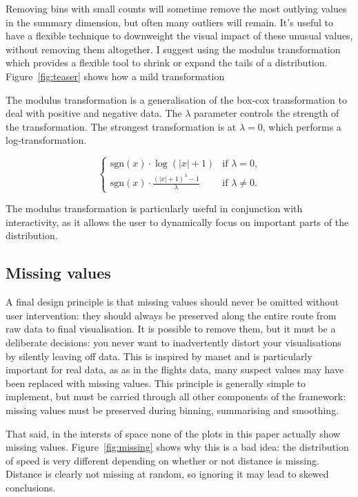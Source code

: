 \documentclass[journal]{vgtc}                %
\begin{document}
Removing bins with small counts will sometime remove the most outlying values in the summary dimension, but often many outliers will remain. It's useful to have a flexible technique to downweight the visual impact of these unusual values, without removing them altogether.  I suggest using the modulus transformation which provides a flexible tool to shrink or expand the tails of a distribution. Figure~\ref{fig:teaser} shows how a mild transformation 

The modulus transformation \citep{john:1980} is a generalisation of the box-cox transformation \citep{box:1964} to deal with positive and negative data. The $\lambda$ parameter controls the strength of the transformation. The strongest transformation is at $\lambda = 0$, which performs a log-transformation. 

\begin{equation}
\begin{cases} 
  \text{sgn}(x) \cdot \log(|x| + 1) & \text{if $\lambda = 0$,} \\
  \text{sgn}(x) \cdot \frac{(|x| + 1)^\lambda - 1}{\lambda} &\text{if $\lambda \ne 0$.}
\end{cases}
\end{equation}

The modulus transformation is particularly useful in conjunction with interactivity, as it allows the user to dynamically focus on important parts of the distribution.

\subsection{Missing values}
\label{sub:missing}

A final design principle is that missing values should never be omitted without user intervention: they should always be preserved along the entire route from raw data to final visualisation. It is possible to remove them, but it must be a deliberate decisions: you never want to inadvertently distort your visualisations by silently leaving off data. This is inspired by {\sc manet} \citep{unwin:1996} and is particularly important for real data, as as in the flights data, many suspect values may have been replaced with missing values. This principle is generally simple to implement, but must be carried through all other components of the framework: missing values must be preserved during binning, summarising and smoothing.

That said, in the intersts of space none of the plots in this paper actually show missing values. Figure~\ref{fig:missing} shows why this is a bad idea: the distribution of speed is very different depending on whether or not distance is missing. Distance is clearly not missing at random, so ignoring it may lead to skewed conclusions.
\end{document}
